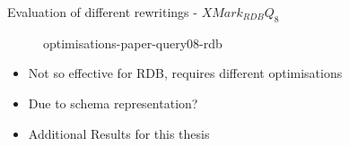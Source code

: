 \begin{frame}{Evaluation of different rewritings - $XMark_{RDB} Q_8$}
  {
    \begin{figure}
      \setlength{\abovecaptionskip}{0pt}
      \setlength{\belowcaptionskip}{0pt}
      {optimisations-paper-query08-rdb}
      \vspace{-5pt}
    \end{figure}
  }
  \vspace{-5pt}
  \begin{block}{}
    \begin{itemize}
    \item Not so effective for RDB, requires different optimisations
    \item Due to schema representation?
    \item Additional Results for this thesis
    \end{itemize}
  \end{block}
\end{frame}



